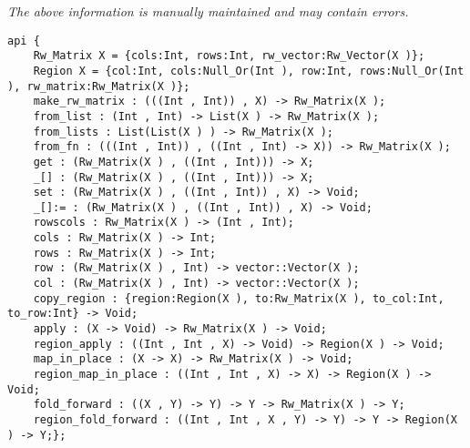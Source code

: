 \label{api:Rw\_Matrix}

{\tiny \it The above information is manually maintained and may contain errors.}
\begin{verbatim}
api {
    Rw_Matrix X = {cols:Int, rows:Int, rw_vector:Rw_Vector(X )};
    Region X = {col:Int, cols:Null_Or(Int ), row:Int, rows:Null_Or(Int ), rw_matrix:Rw_Matrix(X )};
    make_rw_matrix : (((Int , Int)) , X) -> Rw_Matrix(X );
    from_list : (Int , Int) -> List(X ) -> Rw_Matrix(X );
    from_lists : List(List(X ) ) -> Rw_Matrix(X );
    from_fn : (((Int , Int)) , ((Int , Int) -> X)) -> Rw_Matrix(X );
    get : (Rw_Matrix(X ) , ((Int , Int))) -> X;
    _[] : (Rw_Matrix(X ) , ((Int , Int))) -> X;
    set : (Rw_Matrix(X ) , ((Int , Int)) , X) -> Void;
    _[]:= : (Rw_Matrix(X ) , ((Int , Int)) , X) -> Void;
    rowscols : Rw_Matrix(X ) -> (Int , Int);
    cols : Rw_Matrix(X ) -> Int;
    rows : Rw_Matrix(X ) -> Int;
    row : (Rw_Matrix(X ) , Int) -> vector::Vector(X );
    col : (Rw_Matrix(X ) , Int) -> vector::Vector(X );
    copy_region : {region:Region(X ), to:Rw_Matrix(X ), to_col:Int, to_row:Int} -> Void;
    apply : (X -> Void) -> Rw_Matrix(X ) -> Void;
    region_apply : ((Int , Int , X) -> Void) -> Region(X ) -> Void;
    map_in_place : (X -> X) -> Rw_Matrix(X ) -> Void;
    region_map_in_place : ((Int , Int , X) -> X) -> Region(X ) -> Void;
    fold_forward : ((X , Y) -> Y) -> Y -> Rw_Matrix(X ) -> Y;
    region_fold_forward : ((Int , Int , X , Y) -> Y) -> Y -> Region(X ) -> Y;};
\end{verbatim}
\index[fun]{\_[]:=}
\index[fun]{\_[]}
